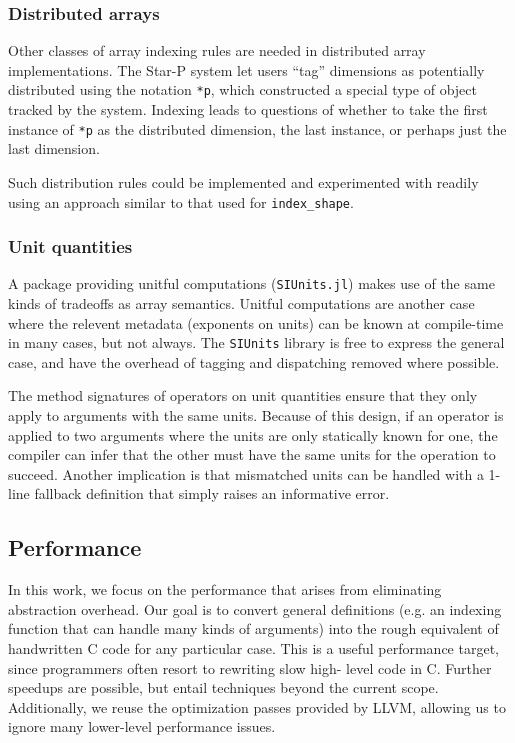 \documentclass[preprint]{sigplanconf}
\newcommand{\code}[1]{\texttt{#1}}
\begin{document}
\subsubsection{Distributed arrays}

Other classes of array indexing rules are needed in distributed array
implementations. The Star-P system \cite{parry, Choy05parallelmatlab}
let users ``tag'' dimensions as potentially distributed using the notation
\code{*p}, which constructed a special type of object tracked by the system.
Indexing leads to questions of whether to take the first instance of \code{*p}
as the distributed dimension, the last instance, or perhaps just the last dimension.

Such distribution rules could be implemented and experimented with readily
using an approach similar to that used for \code{index\_shape}.




\subsubsection{Unit quantities}

A package providing unitful computations (\code{SIUnits.jl}\cite{Fischer:2014si})
makes use of the same kinds of
tradeoffs as array semantics. Unitful computations are another case
where the relevent metadata (exponents on units) can be
known at compile-time in many cases, but not always. The
\code{SIUnits} library is free to express the general case, and have the
overhead of tagging and dispatching removed where possible.

The method signatures of operators on unit quantities ensure that they only
apply to arguments with the same units. Because of this design, if an
operator is applied to two arguments where the units are only statically
known for one, the compiler can infer that the other must have the same units
for the operation to succeed. Another implication is that mismatched units can
be handled with a 1-line fallback definition that simply raises an
informative error.


\subsection{Performance}

In this work, we focus on the performance that arises from eliminating
abstraction overhead. Our goal is to convert general definitions (e.g. an
indexing function that can handle many kinds of arguments) into the rough
equivalent of handwritten C code for any particular case. This is a useful
performance target, since programmers often resort to rewriting slow high-
level code in C. Further speedups are possible, but entail techniques beyond
the current scope. Additionally, we reuse the optimization passes provided by
LLVM\cite{LLVM}, allowing us to ignore many lower-level performance issues.
\end{document}
